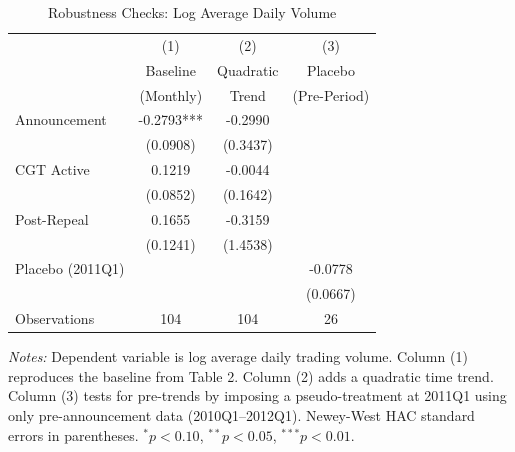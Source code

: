 \begin{table}[htbp]
\centering
\caption{Robustness Checks: Log Average Daily Volume}
\label{tab:robustness}
\begin{threeparttable}
\small
\begin{tabular}{lccc}
\toprule
 & (1) & (2) & (3) \\
 & Baseline & Quadratic & Placebo \\
 & (Monthly) & Trend & (Pre-Period) \\
\midrule
Announcement & -0.2793*** & -0.2990 & \\
 & (0.0908) & (0.3437) & \\[4pt]
CGT Active & 0.1219 & -0.0044 & \\
 & (0.0852) & (0.1642) & \\[4pt]
Post-Repeal & 0.1655 & -0.3159 & \\
 & (0.1241) & (1.4538) & \\[4pt]
Placebo (2011Q1) & & & -0.0778 \\
 & & & (0.0667) \\
\midrule
Observations & 104 & 104 & 26 \\
\bottomrule
\end{tabular}
\begin{tablenotes}[flushleft]\footnotesize
\item \textit{Notes:} Dependent variable is log average daily trading volume. Column (1) reproduces the baseline from Table 2. Column (2) adds a quadratic time trend. Column (3) tests for pre-trends by imposing a pseudo-treatment at 2011Q1 using only pre-announcement data (2010Q1--2012Q1). Newey-West HAC standard errors in parentheses. $^{*}p<0.10$, $^{**}p<0.05$, $^{***}p<0.01$.
\end{tablenotes}
\end{threeparttable}
\end{table}
